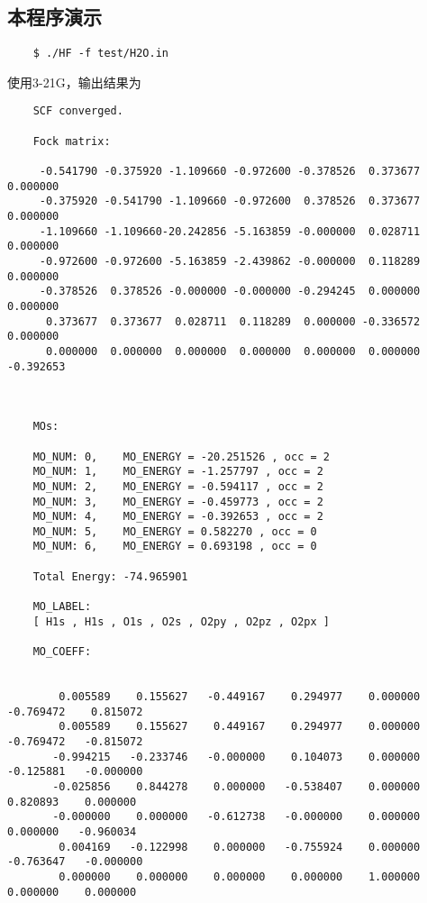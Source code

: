 \documentclass[12pt,a4paper,openany,twoside]{article}
\numberwithin{equation}{section}
\begin{document}
\subsection{本程序演示}
\begin{lstlisting}
    $ ./HF -f test/H2O.in
\end{lstlisting}
使用3-21G，输出结果为
\begin{lstlisting}
    SCF converged.

    Fock matrix:
    
     -0.541790 -0.375920 -1.109660 -0.972600 -0.378526  0.373677  0.000000
     -0.375920 -0.541790 -1.109660 -0.972600  0.378526  0.373677  0.000000
     -1.109660 -1.109660-20.242856 -5.163859 -0.000000  0.028711  0.000000
     -0.972600 -0.972600 -5.163859 -2.439862 -0.000000  0.118289  0.000000
     -0.378526  0.378526 -0.000000 -0.000000 -0.294245  0.000000  0.000000
      0.373677  0.373677  0.028711  0.118289  0.000000 -0.336572  0.000000
      0.000000  0.000000  0.000000  0.000000  0.000000  0.000000 -0.392653
    
    
    
    MOs:
    
    MO_NUM: 0,    MO_ENERGY = -20.251526 , occ = 2
    MO_NUM: 1,    MO_ENERGY = -1.257797 , occ = 2
    MO_NUM: 2,    MO_ENERGY = -0.594117 , occ = 2
    MO_NUM: 3,    MO_ENERGY = -0.459773 , occ = 2
    MO_NUM: 4,    MO_ENERGY = -0.392653 , occ = 2
    MO_NUM: 5,    MO_ENERGY = 0.582270 , occ = 0
    MO_NUM: 6,    MO_ENERGY = 0.693198 , occ = 0
    
    Total Energy: -74.965901
    
    MO_LABEL:
    [ H1s , H1s , O1s , O2s , O2py , O2pz , O2px ]
    
    MO_COEFF:
    
    
        0.005589    0.155627   -0.449167    0.294977    0.000000   -0.769472    0.815072
        0.005589    0.155627    0.449167    0.294977    0.000000   -0.769472   -0.815072
       -0.994215   -0.233746   -0.000000    0.104073    0.000000   -0.125881   -0.000000
       -0.025856    0.844278    0.000000   -0.538407    0.000000    0.820893    0.000000
       -0.000000    0.000000   -0.612738   -0.000000    0.000000    0.000000   -0.960034
        0.004169   -0.122998    0.000000   -0.755924    0.000000   -0.763647   -0.000000
        0.000000    0.000000    0.000000    0.000000    1.000000    0.000000    0.000000
\end{lstlisting}
\end{document}
